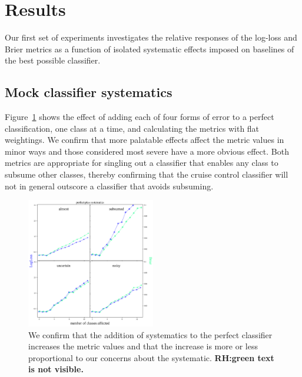 \section{Results}
\label{sec:results}

Our first set of experiments investigates the relative responses of the log-loss and Brier metrics as a function of isolated systematic effects imposed on baselines of the best possible classifier.

\subsection{Mock classifier systematics}
\label{sec:mockresults}

Figure~\ref{fig:cruise} shows the effect of adding each of four forms of error to a perfect classification, one class at a time, and calculating the metrics with flat weightings.
We confirm that more palatable effects affect the metric values in minor ways and those considered most severe have a more obvious effect.
Both metrics are appropriate for singling out a classifier that enables any class to subsume other classes, thereby confirming that the cruise control classifier will not in general outscore a classifier that avoids subsuming.

\begin{figure}
	\begin{center}
		\includegraphics[width=0.5\textwidth]{./fig/systematics_onlyperfect.png}
		\caption{We confirm that the addition of systematics to the perfect classifier increases the metric values and that the increase is more or less proportional to our concerns about the systematic. \textbf{RH:green text is not visible.}}
		\label{fig:cruise}
	\end{center}
\end{figure}



